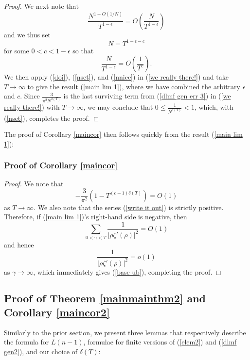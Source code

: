 \documentclass[11pt,article]{amsart}
\numberwithin{equation}{section}
\numberwithin{equation}{section}
\numberwithin{lemma}{section}
\numberwithin{prop}{section}
\begin{document}
\begin{proof}
We next note that 
\begin{equation}
\frac{N^{1-O(1/N)}}{T^{1-\epsilon}}=O\left(\frac{N}{T^{1-\epsilon}}\right) \label{doi}
\end{equation}
and we thus set 
\begin{equation}
N=T^{1-\epsilon-c} \label{nset}
\end{equation} 
for some $0<c<1-\epsilon$ so that 
\begin{equation}
\frac{N}{T^{1-\epsilon}}=O\left(\frac{1}{T^{c}}\right). \label{nnice}
\end{equation}
We then apply (\ref{doi}), (\ref{nset}), and (\ref{nnice}) in (\ref{we really there!}) and take $T\rightarrow \infty$ to give the result (\ref{main lim 1}), where we have combined the arbitrary $\epsilon$ and $c$. Since $\frac{3}{\pi^{2}N^{\delta(T)}}$ is the last surviving term from (\ref{dlmf gen err 3}) in (\ref{we really there!}) with $T\rightarrow \infty$, we may conclude that $0\leq \frac{1}{N^{\delta(T)}}<1$, which, with (\ref{nset}), completes the proof. 
\end{proof}

The proof of Corollary \ref{maincor} then follows quickly from the result (\ref{main lim 1}):

\subsubsection{Proof of Corollary \ref{maincor}}
\begin{proof}
We note that
\begin{equation}
-\frac{3}{\pi^{2}}\left(1-T^{(c-1)\delta(T)}\right)=O(1)
\end{equation}
as $T\rightarrow \infty$. We also note that the series (\ref{write it out}) is strictly positive. Therefore, if (\ref{main lim 1})'s right-hand side is negative, then 
\begin{equation}
\sum_{0<\gamma<T}\frac{1}{\left|\rho\zeta'(\rho)\right|^{2}}=O(1)
\end{equation}
and hence 
\begin{equation}
\frac{1}{\left|\rho\zeta'(\rho)\right|^{2}}=o(1) \label{obviously we have}
\end{equation}
as $\gamma \rightarrow \infty$, which immediately gives (\ref{base ub}), completing the proof. 
\end{proof}

\subsection{Proof of Theorem \ref{mainmainthm2} and Corollary \ref{maincor2}}
Similarly to the prior section, we present three lemmas that respectively describe the formula for $L(n-1)$, formulae for finite versions of (\ref{elem2}) and (\ref{dlmf gen2}), and our choice of $\delta(T)$:
\end{document}
